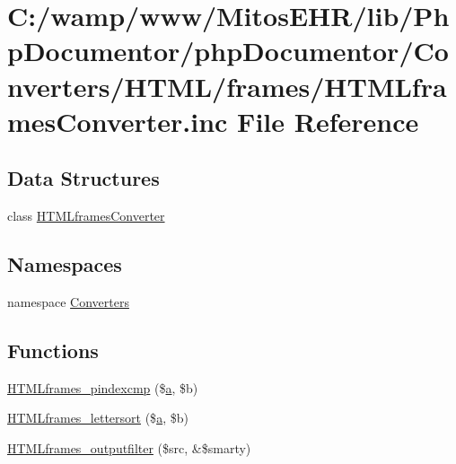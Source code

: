 \hypertarget{_h_t_m_lframes_converter_8inc}{\section{\-C\-:/wamp/www/\-Mitos\-E\-H\-R/lib/\-Php\-Documentor/php\-Documentor/\-Converters/\-H\-T\-M\-L/frames/\-H\-T\-M\-Lframes\-Converter.inc \-File \-Reference}
\label{_h_t_m_lframes_converter_8inc}
}
\subsection*{\-Data \-Structures}
\begin{DoxyCompactItemize}
\item 
class \hyperlink{class_h_t_m_lframes_converter}{\-H\-T\-M\-Lframes\-Converter}
\end{DoxyCompactItemize}
\subsection*{\-Namespaces}
\begin{DoxyCompactItemize}
\item 
namespace \hyperlink{namespace_converters}{\-Converters}
\end{DoxyCompactItemize}
\subsection*{\-Functions}
\begin{DoxyCompactItemize}
\item 
\hyperlink{_h_t_m_lframes_converter_8inc_a9078c8cbcd40a326cf75fe68ef5f86da}{\-H\-T\-M\-Lframes\-\_\-pindexcmp} (\$\hyperlink{classa}{a}, \$b)
\item 
\hyperlink{_h_t_m_lframes_converter_8inc_a170c4f861d1034a9e8dcf332545c033f}{\-H\-T\-M\-Lframes\-\_\-lettersort} (\$\hyperlink{classa}{a}, \$b)
\item 
\hyperlink{_h_t_m_lframes_converter_8inc_ae42562214b3dbccbe4de209854fa50a0}{\-H\-T\-M\-Lframes\-\_\-outputfilter} (\$src, \&\$smarty)
\end{DoxyCompactItemize}


